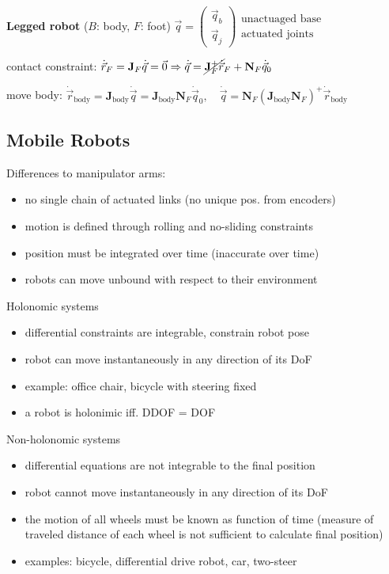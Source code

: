 \documentclass[fontsize=6pt]{scrartcl}
\newcommand{\mat}[1]{\mathbf{#1}}
\begin{document}
\begin{multicols*}{4}
\begin{minipage}{0.65\linewidth}
\end{minipage}

\textbf{Legged robot} ($B$: body, $F$: foot) 
$\vec{q} = \begin{pmatrix}
\vec q_b\\
\vec q_j
\end{pmatrix}
\begin{matrix}
\text{unactuaged base}\\
\text{actuated joints}
\end{matrix}
$

contact constraint: $\dot{\vec r}_F = \mat J_F \dot{\vec{q}} = \vec{0} \Rightarrow \dot{\vec{q}} = \cancel{\mat J_F^+ \dot{\vec{r}}}_F + \mat N_F \dot{\vec{q}}_0$

move body: $ \dot{\vec r}_\text{body} = \mat J_\text{body} \dot{\vec{q}} = \mat J_\text{body}\mat N_F \dot{\vec{q}}_0, \quad \dot{\vec{q}} = \mat N_F (\mat J_\text{body} \mat N_F)^+\dot{\vec{r}}_\text{body}$

\subsection*{Mobile Robots}
Differences to manipulator arms:
\begin{itemize}
	\item no single chain of actuated links (no unique pos. from encoders) 
	\item motion is defined through rolling and no-sliding constraints
	\item position must be integrated over time (inaccurate over time)
	\item robots can move unbound with respect to their environment 
\end{itemize}

Holonomic systems
\begin{itemize}
	\item differential constraints are integrable, constrain robot pose
	\item robot can move instantaneously in any direction of its DoF
	\item example: office chair, bicycle with steering fixed
	\item a robot is holonimic iff. DDOF = DOF
\end{itemize}

Non-holonomic systems
\begin{itemize}
	\item differential equations are not integrable to the final position
	\item robot cannot move instantaneously in any direction of its DoF
	\item the motion of all wheels must be known as function of time (measure of traveled distance of each wheel is not sufficient to calculate final position)
	\item examples: bicycle, differential drive robot, car, two-steer
\end{itemize}


\end{multicols*}
\end{document}
